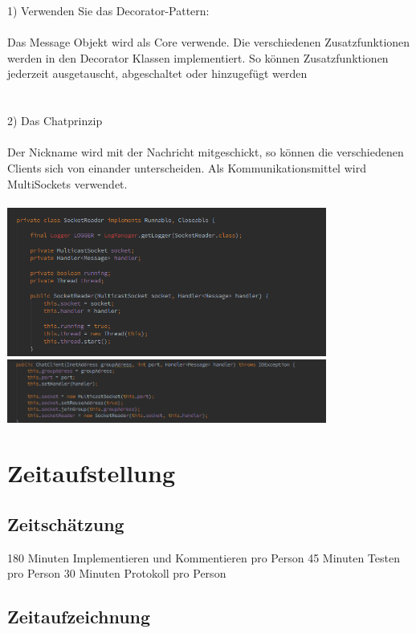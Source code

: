 \documentclass[a4paper, 11pt]{article}
\begin{document}
1) Verwenden Sie das Decorator-Pattern:
\\\\
Das Message Objekt wird als Core verwende.
Die verschiedenen Zusatzfunktionen werden in den Decorator Klassen implementiert. So können Zusatzfunktionen jederzeit ausgetauscht, abgeschaltet oder hinzugefügt werden
\\\\\\
2) Das Chatprinzip
\\\\
Der Nickname wird mit der Nachricht mitgeschickt, so können die verschiedenen Clients sich von einander unterscheiden. Als Kommunikationsmittel wird MultiSockets verwendet.
\\\\
\includegraphics[width=10.5cm]{socketr}
\includegraphics[width=10.5cm]{socketimp}

\section{Zeitaufstellung}

\subsection{Zeitschätzung}
180 Minuten Implementieren und Kommentieren pro Person
45 Minuten Testen pro Person
30 Minuten Protokoll pro Person

\subsection{Zeitaufzeichnung}
\end{document}
